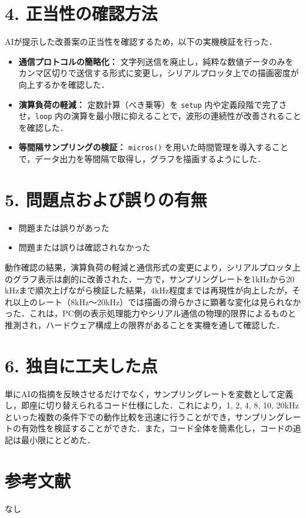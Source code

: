 \documentclass[uplatex]{jsarticle}
\begin{document}
\section*{4. 正当性の確認方法}
AIが提示した改善案の正当性を確認するため，以下の実機検証を行った．
\begin{itemize}
	\item \textbf{通信プロトコルの簡略化：} 文字列送信を廃止し，純粋な数値データのみをカンマ区切りで送信する形式に変更し，シリアルプロッタ上での描画密度が向上するかを確認した．
	\item \textbf{演算負荷の軽減：} 定数計算（べき乗等）を \texttt{setup} 内や定義段階で完了させ，\texttt{loop} 内の演算を最小限に抑えることで，波形の連続性が改善されることを確認した．
	\item \textbf{等間隔サンプリングの検証：} \texttt{micros()} を用いた時間管理を導入することで，データ出力を等間隔で取得し，グラフを描画するようにした．
\end{itemize}

\section*{5. 問題点および誤りの有無}
\begin{itemize}
\renewcommand{\labelitemi}{}
  \item \Square 問題または誤りがあった
  \item \CheckedBox 問題または誤りは確認されなかった
\end{itemize}
動作確認の結果，演算負荷の軽減と通信形式の変更により，シリアルプロッタ上のグラフ表示は劇的に改善された．一方で，サンプリングレートを1kHzから20 kHzまで順次上げながら検証した結果，4kHz程度までは再現性が向上したが，それ以上のレート（8kHz〜20kHz）では描画の滑らかさに顕著な変化は見られなかった．これは，PC側の表示処理能力やシリアル通信の物理的限界によるものと推測され，ハードウェア構成上の限界があることを実機を通して確認した．

\section*{6. 独自に工夫した点}
単にAIの指摘を反映させるだけでなく，サンプリングレートを変数として定義し，即座に切り替えられるコード仕様にした．これにより，1, 2, 4, 8, 10, 20kHzといった複数の条件下での動作比較を迅速に行うことができ，サンプリングレートの有効性を検証することができた．また，コード全体を簡素化し，コードの追記は最小限にとどめた．
\section*{参考文献}
なし
\end{document}
